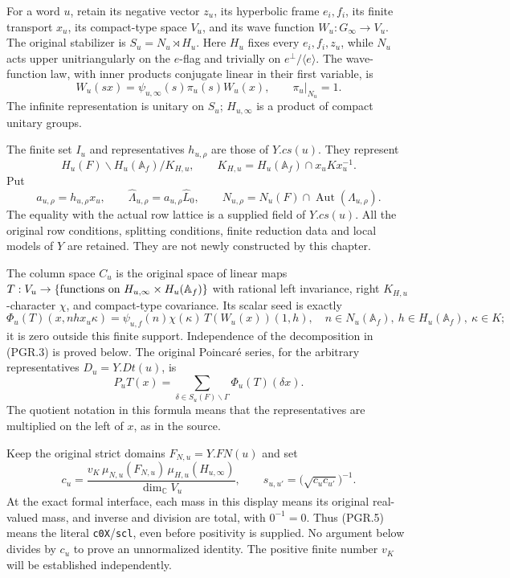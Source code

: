 For a word \(u\), retain its negative vector \(z_u\), its
hyperbolic frame \(e_i,f_i\), its finite transport \(x_u\), its
compact-type space \(V_u\), and its wave function
\(W_u:G_\infty\to V_u\).  The original stabilizer is
\(S_u=N_u\rtimes H_u\).  Here \(H_u\) fixes every
\(e_i,f_i,z_u\), while \(N_u\) acts upper unitriangularly on the
\(e\)-flag and trivially on \(e^\perp/\langle e\rangle\).
The wave-function law, with inner products conjugate linear in their
first variable, is
\[
 W_u(sx)=\psi_{u,\infty}(s)\pi_u(s)W_u(x),
 \qquad \pi_u|_{N_u}=1.
\tag{PGR.1}
\]
The infinite representation is unitary on \(S_u\); \(H_{u,\infty}\)
is a product of compact unitary groups.

The finite set \(I_u\) and representatives \(h_{u,\rho}\) are
those of \(Y.cs(u)\).  They represent
\[
 H_u(F)\backslash H_u(\mathbb A_f)/K_{H,u},\qquad
 K_{H,u}=H_u(\mathbb A_f)\cap x_uKx_u^{-1}.
\]
Put
\[
 a_{u,\rho}=h_{u,\rho}x_u,\qquad
 \widehat\Lambda_{u,\rho}=a_{u,\rho}\widehat L_0,
 \qquad N_{u,\rho}=N_u(F)\cap\operatorname{Aut}(\Lambda_{u,\rho}).
\tag{PGR.2}
\]
The equality with the actual row lattice is a supplied field of
\(Y.cs(u)\).  All the original row conditions, splitting conditions,
finite reduction data and local models of \(Y\) are retained.
They are not newly constructed by this chapter.

The column space \(C_u\) is the original space of linear maps
\(T:V_u\to\{\hbox{functions on }H_{u,\infty}\times H_u(\mathbb A_f)\}\)
with rational left invariance, right \(K_{H,u}\)-character \(\chi\),
and compact-type covariance.  Its scalar seed is exactly
\[
 \Phi_u(T)(x,n h x_u\kappa)
   =\psi_{u,f}(n)\chi(\kappa)\,T(W_u(x))(1,h),
 \quad n\in N_u(\mathbb A_f),\ h\in H_u(\mathbb A_f),\ \kappa\in K;
\tag{PGR.3}
\]
it is zero outside this finite support.  Independence of the
decomposition in (PGR.3) is proved below.  The original Poincar\'e
series, for the arbitrary representatives \(D_u=Y.Dt(u)\), is
\[
 P_uT(x)=\sum_{\delta\in S_u(F)\backslash\Gamma}
                         \Phi_u(T)(\delta x).
\tag{PGR.4}
\]
The quotient notation in this formula means that the representatives
are multiplied on the left of \(x\), as in the source.

Keep the original strict domains \(F_{N,u}=Y.FN(u)\) and set
\[
 c_u=\frac{v_K\,\mu_{N,u}(F_{N,u})\,\mu_{H,u}(H_{u,\infty})}
                 {\dim_{\mathbb C}V_u},\qquad
 s_{u,u'}=\bigl(\sqrt{c_uc_{u'}}\bigr)^{-1}.
\tag{PGR.5}
\]
At the exact formal interface, each mass in this display means its
original real-valued mass, and inverse and division are total, with
\(0^{-1}=0\).  Thus (PGR.5) means the literal
\texttt{c0X}/\texttt{scl}, even before positivity is supplied.
No argument below divides by \(c_u\) to prove an unnormalized identity.
The positive finite number \(v_K\) will be established independently.

